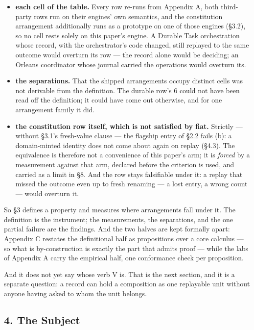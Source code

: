 \documentclass[
]{article}
\providecommand{\tightlist}{%
  \setlength{\itemsep}{0pt}\setlength{\parskip}{0pt}}
\begin{document}
\begin{itemize}
\tightlist
\item
  \textbf{each cell of the table.} Every row re-runs from Appendix A,
  both third-party rows run on their engines' own semantics, and the
  constitution arrangement additionally runs as a prototype on one of
  those engines (§3.2), so no cell rests solely on this paper's engine.
  A Durable Task orchestration whose record, with the orchestrator's
  code changed, still replayed to the same outcome would overturn its
  row --- the record alone would be deciding; an Orleans coordinator
  whose journal carried the operations would overturn its.
\item
  \textbf{the separations.} That the shipped arrangements occupy
  distinct cells was not derivable from the definition. The durable
  row's 6 could not have been read off the definition; it could have
  come out otherwise, and for one arrangement family it did.
\item
  \textbf{the constitution row itself, which is not satisfied by fiat.}
  Strictly --- without §3.1's fresh-value clause --- the flagship entry
  of §2.2 fails (b): a domain-minted identity does not come about again
  on replay (§4.3). The equivalence is therefore not a convenience of
  this paper's arm; it is \emph{forced} by a measurement against that
  arm, declared before the criterion is used, and carried as a limit in
  §8. And the row stays falsifiable under it: a replay that missed the
  outcome even up to fresh renaming --- a lost entry, a wrong count ---
  would overturn it.
\end{itemize}

So §3 defines a property and measures where arrangements fall under it.
The definition is the instrument; the measurements, the separations, and
the one partial failure are the findings. And the two halves are kept
formally apart: Appendix C restates the definitional half as
propositions over a core calculus --- so what is by-construction is
exactly the part that admits proof --- while the labs of Appendix A
carry the empirical half, one conformance check per proposition.

And it does not yet say whose verb V is. That is the next section, and
it is a separate question: a record can hold a composition as one
replayable unit without anyone having asked to whom the unit belongs.

\subsection{4. The Subject}\label{the-subject}
\end{document}
